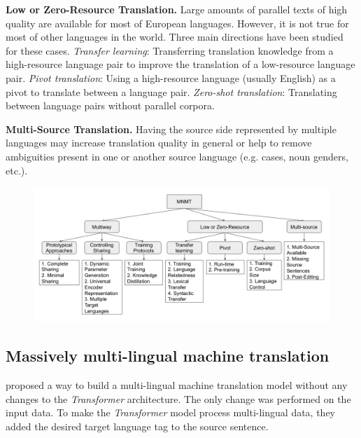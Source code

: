 \textbf{Low or Zero-Resource Translation.}
Large amounts of parallel texts of high quality are available for most of European
languages. However, it is not true for most of other languages in the world.
Three main directions have been studied for these cases.
\textit{Transfer learning}: Transferring translation knowledge from a high-resource language pair
to improve the translation of a low-resource language pair.
\textit{Pivot translation}: Using a high-resource language (usually English) as a pivot to translate
between a language pair.
\textit{Zero-shot translation}: Translating between language pairs without parallel corpora.

\textbf{Multi-Source Translation.} Having the source side represented by multiple languages
may increase translation quality in general or help to remove ambiguities present in one or another
source language (e.g. cases, noun genders, etc.).


\begin{figure}[h]
	\begin{minipage}{0.9\textwidth}
	\centering
	\includegraphics[width=1.0\columnwidth]{../img/dabre_2019_mnmt_categorized.png}
	\end{minipage}\hfill
	\label{fig:mnmt_categorized}
\end{figure}


\subsection{Massively multi-lingual machine translation }
\label{section:multitarget_theory}

\citet{johnson-etal-2017-googles} proposed a way to build a multi-lingual
machine translation model without any changes to the \emph{Transformer} architecture.
The only change was performed on the input data.
To make the \emph{Transformer} model process multi-lingual data,
they added the desired target language tag to the source sentence.

